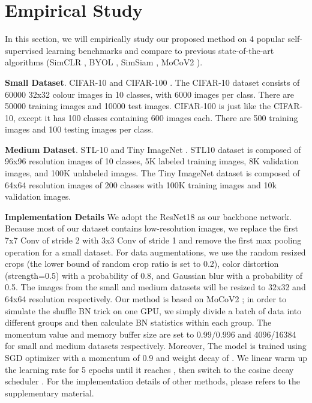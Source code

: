 \documentclass{article}
\newcommand{\<}{\left\langle}
\renewcommand{\>}{\right\rangle}
\begin{document}
\section{Empirical Study}
\vspace{-10pt}
In this section, we will empirically study our proposed method on 4 popular self-supervised learning benchmarks and compare to previous state-of-the-art algorithms (SimCLR \cite{simclr}, BYOL \cite{byol}, SimSiam \cite{SimSiam}, MoCoV2 \cite{mocov2}).

\textbf{Small Dataset}.
CIFAR-10 and CIFAR-100 \cite{cifar}. The CIFAR-10 dataset consists of 60000 32x32 colour images in 10 classes, with 6000 images per class. There are 50000 training images and 10000 test images. CIFAR-100 is just like the CIFAR-10, except it has 100 classes containing 600 images each. There are 500 training images and 100 testing images per class.

\textbf{Medium Dataset}.
STL-10 \cite{stl10} and Tiny ImageNet \cite{tinyImagenet}. STL10 \cite{stl10} dataset is composed of 96x96 resolution images of 10 classes, 5K labeled training images, 8K validation images, and 100K unlabeled images. The Tiny ImageNet dataset is composed of 64x64 resolution images of 200 classes with 100K training images and 10k validation images.


\textbf{Implementation Details}
We adopt the ResNet18 \cite{resnet} as our backbone network. Because most of our dataset contains low-resolution images, we replace the first 7x7 Conv of stride 2 with 3x3 Conv of stride 1 and remove the first max pooling operation for a small dataset. For data augmentations, we use the random resized crops (the lower bound of random crop ratio is set to 0.2), color distortion (strength=0.5) with a probability of 0.8, and Gaussian blur with a probability of 0.5. The images from the small and medium datasets will be resized to 32x32 and 64x64 resolution respectively. Our method is based on MoCoV2 \cite{mocov2}; in order to simulate the shuffle BN trick on one GPU, we simply divide a batch of data into different groups and then calculate BN statistics within each group. The momentum value and memory buffer size are set to 0.99/0.996 and 4096/16384 for small and medium datasets respectively. Moreover, The model is trained using SGD optimizer with a momentum of 0.9 and weight decay of . We linear warm up the learning rate for 5 epochs until it reaches , then switch to the cosine decay scheduler  \cite{cosine_lr}. For the implementation details of other methods, please refers to the supplementary material.
\end{document}
